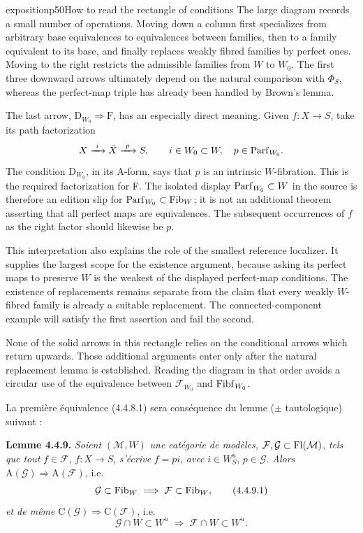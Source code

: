 \begin{dcomment}{exposition}{p50}{How to read the rectangle of conditions}
The large diagram records a small number of operations. Moving down a column first specializes from arbitrary base equivalences to equivalences between families, then to a family equivalent to its base, and finally replaces weakly fibred families by perfect ones. Moving to the right restricts the admissible families from $W$ to $W_0$. The first three downward arrows ultimately depend on the natural comparison with $\Phi_S$, whereas the perfect-map triple has already been handled by Brown's lemma.

The last arrow, $\mathrm D_{W_0}\Rightarrow\mathrm F$, has an especially direct meaning. Given $f:X\to S$, take its path factorization
\[
 X\xrightarrow{\ i\ }\bar X\xrightarrow{\ p\ }S,
 \qquad i\in W_0\subset W,\quad p\in\Parf_{W_0}.
\]
The condition $\mathrm D_{W_0}$, in its A-form, says that $p$ is an intrinsic $W$-fibration. This is the required factorization for F. The isolated display $\mathrm{Parf}_{W_0}\subset W$ in the source is therefore an edition slip for $\mathrm{Parf}_{W_0}\subset\mathrm{Fib}_W$; it is not an additional theorem asserting that all perfect maps are equivalences. The subsequent occurrences of $f$ as the right factor should likewise be $p$.

This interpretation also explains the role of the smallest reference localizer. It supplies the largest scope for the existence argument, because asking its perfect maps to preserve $W$ is the weakest of the displayed perfect-map conditions. The existence of replacements remains separate from the claim that every weakly $W$-fibred family is already a suitable replacement. The connected-component example will satisfy the first assertion and fail the second.

None of the solid arrows in this rectangle relies on the conditional arrows which return upwards. Those additional arguments enter only after the natural replacement lemma is established. Reading the diagram in that order avoids a circular use of the equivalence between $\mathcal F_{W_0}$ and $\mathrm{Fibf}_{W_0}$.
\end{dcomment}


La première équivalence (4.4.8.1) sera conséquence du lemme ($\pm$ tautologique) suivant :

\textbf{Lemme 4.4.9.} \textit{Soient} $(\mathcal{M}, W)$ \textit{une catégorie de modèles,} $\mathcal{F}, \mathcal{G} \subset \operatorname{Fl}(\mathcal{M})$, \textit{tels que tout} $f \in \mathcal{F}$, $f : X \longrightarrow S$, \textit{s'écrive} $f = pi$, \textit{avec} $i \in W^u_S$, $p \in \mathcal{G}$. \textit{Alors} $\mathrm{A}(\mathcal{G}) \Longrightarrow \mathrm{A}(\mathcal{F})$, i.e.
\[
\mathcal{G} \subset \mathrm{Fib}_W \;\Longrightarrow\; \mathcal{F} \subset \mathrm{Fib}_W,
\tag*{(4.4.9.1)}
\]
\textit{et de même} $\mathrm{C}(\mathcal{G}) \Longrightarrow \mathrm{C}(\mathcal{F})$, i.e.
\[
\mathcal{G} \cap W \subset W^u \;\Longrightarrow\; \mathcal{F} \cap W \subset W^u.
\tag*{(4.4.9.2)}
\]

